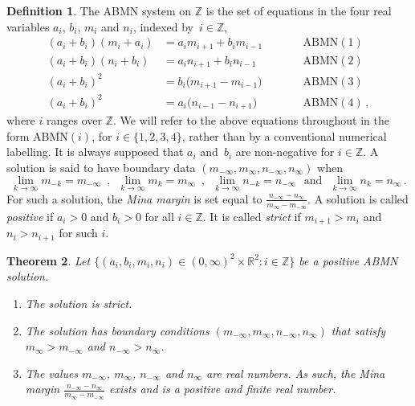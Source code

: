 \documentclass[letterpaper,11pt,oneside,reqno]{amsbook}
\newcommand{\R}{\ensuremath{\mathbb{R}}}
\newcommand{\Z}{\ensuremath{\mathbb{Z}}}
\newtheorem{theorem}{Theorem}[chapter]
\numberwithin{figure}{chapter}
\theoremstyle{definition}
\theoremstyle{definition}
\theoremstyle{definition}
\newtheorem{definition}[theorem]{Definition}
\theoremstyle{definition}
\theoremstyle{definition}
\newcommand{\abmnmac}{\textrm{ABMN}}
\newcommand{\abmnmacspace}{\textrm{ABMN} }
\def\hfff#1{\label{#1}}
\begin{document}
 \begin{definition}\label{d.abmn}
The ABMN system on $\Z$ is the set of equations in the four real variables $a_i$, $b_i$, $ m_i$ and $n_i$, indexed by~$i \in \Z$, 
\begin{align*}
  (a_i + b_i)(m_i+a_i)  & =  a_i m_{i+1} + b_i m_{i-1} && \qquad \textrm{ABMN}(1) \\
  (a_i + b_i)(n_i+b_i)  & =  a_i n_{i+1} + b_i n_{i-1}  &&\qquad \textrm{ABMN}(2)   \\
  (a_i + b_i)^2  & =  b_i \big( m_{i+1} - m_{i-1} \big) &&\qquad \textrm{ABMN}(3)   \\
      (a_i + b_i)^2  & =   a_i \big( n_{i-1} - n_{i+1} \big) &&\qquad \textrm{ABMN}(4)   \, ,
  \end{align*}
 where $i$ ranges over $\Z$. We will refer to the above equations throughout in the form \abmnmac$(i)$, for $i \in \{1,2,3,4\}$, rather than by a conventional numerical labelling.
 It is always supposed that $a_i$ and~$b_i$ are non-negative for $i \in \Z$. 
 A solution is said\hfff{boundarydata} to have boundary data $(m_{-\infty},m_\infty,n_{-\infty},n_\infty)$ when 
 \begin{equation}\label{e.boundarydata}
 \lim_{k \to \infty} m_{-k} = m_{-\infty} \, \, \, , \, \, \,
 \lim_{k \to \infty} m_k = m_\infty \, \, \, , \, \, \, 
 \lim_{k \to \infty} n_{-k} = n_{-\infty} \,\,\,\,
 \textrm{and}
 \,\,\,\, \lim_{k \to \infty} n_k = n_\infty \, . 
 \end{equation}
 For such a solution, the {\em Mina margin}\hfff{minamargin} is set equal to $\frac{n_{-\infty} - n_\infty}{m_\infty - m_{-\infty}}$.
 A solution is called {\em positive} if $a_i > 0$ and $b_i > 0$ for all $i \in \Z$.\hfff{positiveabmn} It is called {\em strict} if $m_{i+1} > m_i$ and $n_i > n_{i+1}$ for such $i$.
 \end{definition}
 \begin{theorem}\label{t.positiveabmn}
 Let $\big\{ (a_i,b_i,m_i,n_i) \in (0,\infty)^2 \times \R^2: i \in \Z  \big\}$ be a positive \abmnmacspace  solution.
 \begin{enumerate}
 \item The solution is strict.
 \item The solution has boundary conditions $(m_{-\infty},m_\infty,n_{-\infty},n_\infty)$  that satisfy $m_\infty > m_{-\infty}$ and $n_{-\infty} > n_\infty$.
 \item The values $m_{-\infty}$, $m_\infty$, $n_{-\infty}$ and $n_\infty$ are real numbers.  As such, the Mina margin $\frac{n_{-\infty} - n_\infty}{m_\infty - m_{-\infty}}$ exists and is a positive and finite real number.
 \end{enumerate}
 \end{theorem}
\end{document}
